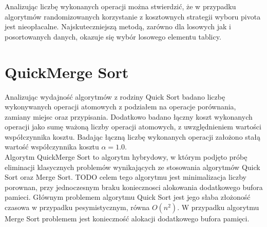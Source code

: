 Analizując liczbę wykonanych operacji można stwierdzić, że w przypadku algorytmów randomizowanych korzystanie z kosztownych strategii wyboru pivota jest nieopłacalne. Najskuteczniejszą metodą, zarówno dla losowych jak i posortowanych danych, okazuje się wybór losowego elementu tablicy.\\


\section{QuickMerge Sort}



Analizując wydajność algorytmów z rodziny Quick Sort badano liczbę wykonywanych operacji atomowych z podziałem na operacje porównania, zamiany miejsc oraz przypisania. Dodatkowo badano łączny koszt wykonanych operacji jako sumę ważoną liczby operacji atomowych, z uwzględnieniem wartości współczynnika kosztu. Badając łączną liczbę wykonanych operacji założono stałą wartość współczynnika kosztu $\alpha = 1.0$.\\

Algorytm QuickMerge Sort to algorytm hybrydowy, w którym podjęto próbę eliminacji klasycznych problemów wynikających ze stosowania algorytmów Quick Sort oraz Merge Sort. 
TODO celem tego algorytmu jest minimalizacja liczby porownan, przy jednoczesnym braku koniecznosci alokowania dodatkowego bufora pamieci.
Głównym problemem algorytmu Quick Sort jest jego słaba złożoność czasowa w przypadku pesymistycznym, równa $O(n^2)$.  W przypadku algorytmu Merge Sort problemem jest konieczność alokacji dodatkowego bufora pamięci.\\ 

